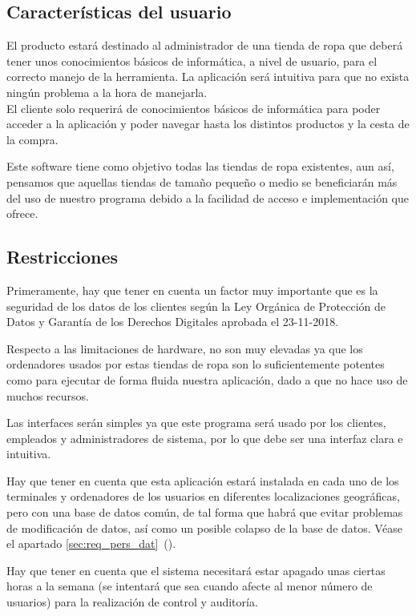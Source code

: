 \subsection{Características del usuario}
El producto estará destinado al administrador de una tienda de ropa que deberá tener unos conocimientos básicos de informática, a nivel de usuario, para el correcto manejo de la herramienta. La aplicación será intuitiva para que no exista ningún problema a la hora de manejarla.\\
El cliente solo requerirá de conocimientos básicos de informática para poder acceder a la aplicación y poder navegar hasta los distintos productos y la cesta de la compra.

Este software tiene como objetivo todas las tiendas de ropa existentes, aun así, pensamos
que aquellas tiendas de tamaño pequeño o medio se beneficiarán más del uso de
nuestro programa debido a la facilidad de acceso e implementación que ofrece.
\subsection{Restricciones}
Primeramente, hay que tener en cuenta un factor muy importante que es la seguridad
de los datos de los clientes según la Ley Orgánica de Protección de Datos y Garantía de
los Derechos Digitales aprobada el 23-11-2018.

Respecto a las limitaciones de hardware, no son muy elevadas ya que los ordenadores
usados por estas tiendas de ropa son lo suficientemente potentes como para ejecutar de forma fluida nuestra
aplicación, dado a que no hace uso de muchos recursos.

Las interfaces serán simples ya que este programa será usado por los clientes, empleados y
administradores de sistema, por lo que debe ser una interfaz clara e intuitiva.

Hay que tener en cuenta que esta aplicación estará instalada en cada uno de los
terminales y ordenadores de los usuarios en diferentes localizaciones geográficas, pero
con una base de datos común, de tal forma que habrá que evitar problemas de
modificación de datos, así como un posible colapso de la base de datos. Véase el apartado \ref{sec:req_pers_dat}~().

Hay que tener en cuenta que el sistema necesitará estar apagado unas ciertas horas a
la semana (se intentará que sea cuando afecte al menor número de usuarios) para la
realización de control y auditoría.

